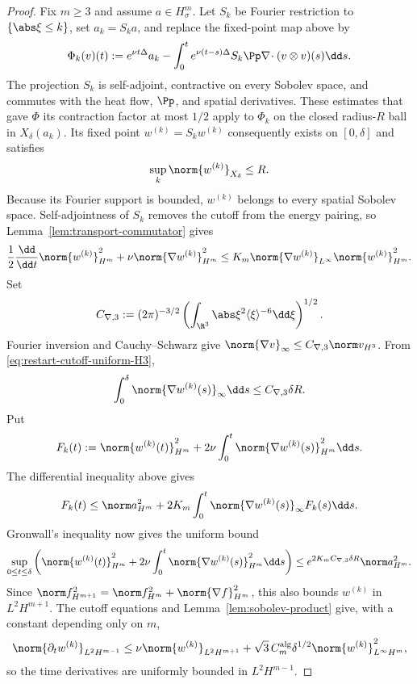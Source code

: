 \begin{proof}
Fix \(m\ge3\) and assume \(a\in H^m_\sigma\).  Let \(S_k\) be Fourier
restriction to \(\{\abs\xi\le k\}\), set \(a_k=S_ka\), and replace the
fixed-point map above by
\[
 \Phi_k(v)(t):=e^{\nu t\Delta}a_k
 -\int_0^te^{\nu(t-s)\Delta}S_k\Pp\nabla\!\cdot
   (v\otimes v)(s)\dd s.
\]
The projection \(S_k\) is self-adjoint, contractive on every Sobolev space,
and commutes with the heat flow, \(\Pp\), and spatial derivatives.  These estimates that gave \(\Phi\) its contraction factor at most \(1/2\) apply to
\(\Phi_k\) on the closed radius-\(R\) ball in \(X_\delta(a_k)\).  Its fixed point
\(w^{(k)}=S_kw^{(k)}\) consequently exists on \([0,\delta]\) and satisfies
\begin{equation}
 \sup_k\norm{w^{(k)}}_{X_\delta}\le R.
 \label{eq:restart-cutoff-uniform-H3}
\end{equation}
Because its Fourier support is bounded, \(w^{(k)}\) belongs to every spatial
Sobolev space.  Self-adjointness of \(S_k\) removes the cutoff from the energy
pairing, so Lemma~\ref{lem:transport-commutator} gives
\[
 \frac12\frac{\dd}{\dd t}\norm{w^{(k)}}_{H^m}^2
 +\nu\norm{\nabla w^{(k)}}_{H^m}^2
 \le K_m\norm{\nabla w^{(k)}}_{L^\infty}
       \norm{w^{(k)}}_{H^m}^2.
\]
Set
\[
 C_{\nabla,3}:=(2\pi)^{-3/2}
 \left(\int_{\R^3}\abs\xi^2\langle\xi\rangle^{-6}\dd\xi\right)^{1/2}.
\]
Fourier inversion and Cauchy--Schwarz give
\(\norm{\nabla v}_\infty\le C_{\nabla,3}\norm v_{H^3}\).  From
\eqref{eq:restart-cutoff-uniform-H3},
\[
 \int_0^\delta\norm{\nabla w^{(k)}(s)}_\infty\dd s
 \le C_{\nabla,3}\delta R.
\]
Put
\[
 F_k(t):=\norm{w^{(k)}(t)}_{H^m}^2
 {}+2\nu\int_0^t\norm{\nabla w^{(k)}(s)}_{H^m}^2\dd s.
\]
The differential inequality above gives
\[
 F_k(t)\le\norm a_{H^m}^2
 {}+2K_m\int_0^t\norm{\nabla w^{(k)}(s)}_\infty F_k(s)\dd s.
\]
Gronwall's inequality now gives the uniform bound
\begin{equation}
 \sup_{0\le t\le\delta}\left(
 \norm{w^{(k)}(t)}_{H^m}^2
{}+2\nu\int_0^t\norm{\nabla w^{(k)}(s)}_{H^m}^2\dd s
 \right)
 \le e^{2K_mC_{\nabla,3}\delta R}\norm a_{H^m}^2.
 \label{eq:restart-cutoff-uniform-Hm}
\end{equation}
Since
\(
 \norm f_{H^{m+1}}^2=\norm f_{H^m}^2+\norm{\nabla f}_{H^m}^2
\), this also bounds \(w^{(k)}\) in \(L^2H^{m+1}\).  The cutoff equations
and Lemma~\ref{lem:sobolev-product} give, with a constant depending only on
\(m\),
\[
 \norm{\partial_tw^{(k)}}_{L^2H^{m-1}}
 \le \nu\norm{w^{(k)}}_{L^2H^{m+1}}
 +\sqrt3\,C_m^{\rm alg}\delta^{1/2}
   \norm{w^{(k)}}_{L^\infty H^m}^2,
\]
so the time derivatives are uniformly bounded in \(L^2H^{m-1}\).


\end{proof}
